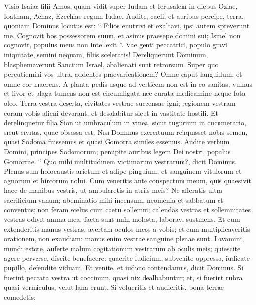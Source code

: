 \begin{biblechapter}
 \verse Visio Isaiae filii Amos, quam vidit super Iudam et Ierusalem in diebus Oziae, Ioatham, Achaz, Ezechiae regum Iudae.
 \verse Audite, caeli, et auribus percipe, terra,
 quoniam Dominus locutus est:
 “ Filios enutrivi et exaltavi,
 ipsi autem spreverunt me.
 \verse Cognovit bos possessorem suum,
 et asinus praesepe domini sui;
 Israel non cognovit,
 populus meus non intellexit ”.
 \verse Vae genti peccatrici,
 populo gravi iniquitate,
 semini nequam, filiis sceleratis!
 Dereliquerunt Dominum,
 blasphemaverunt Sanctum Israel,
 abalienati sunt retrorsum.
 \verse Super quo percutiemini vos ultra,
 addentes praevaricationem?
 Omne caput languidum,
 et omne cor maerens.
 \verse A planta pedis usque ad verticem
 non est in eo sanitas;
 vulnus et livor et plaga tumens
 non est circumligata
 nec curata medicamine neque fota oleo.
 \verse Terra vestra deserta,
 civitates vestrae succensae igni;
 regionem vestram coram vobis alieni devorant,
 et desolabitur sicut in vastitate hostili.
 \verse Et derelinquetur filia Sion
 ut umbraculum in vinea,
 sicut tugurium in cucumerario,
 sicut civitas, quae obsessa est.
 \verse Nisi Dominus exercituum reliquisset nobis semen,
 quasi Sodoma fuissemus
 et quasi Gomorra similes essemus.
 \verse Audite verbum Domini,
 principes Sodomorum;
 percipite auribus legem Dei nostri, populus Gomorrae.
 \verse “ Quo mihi multitudinem victimarum vestrarum?,
 dicit Dominus.
 Plenus sum holocaustis arietum
 et adipe pinguium;
 et sanguinem vitulorum
 et agnorum et hircorum nolui.
 \verse Cum veneritis ante conspectum meum,
 quis quaesivit haec de manibus vestris,
 ut ambularetis in atriis meis?
 \verse Ne afferatis ultra sacrificium vanum;
 abominatio mihi incensum,
 neomenia et sabbatum et conventus;
 non feram scelus cum coetu sollemni;
 \verse calendas vestras et sollemnitates vestras odivit anima mea,
 facta sunt mihi molesta, laboravi sustinens.
 \verse Et cum extenderitis manus vestras,
 avertam oculos meos a vobis;
 et cum multiplicaveritis orationem,
 non exaudiam:
 manus enim vestrae sanguine plenae sunt.
 \verse Lavamini, mundi estote,
 auferte malum cogitationum vestrarum ab oculis meis;
 quiescite agere perverse,
 \verse discite benefacere:
 quaerite iudicium, subvenite oppresso,
 iudicate pupillo, defendite viduam.
 \verse Et venite, et iudicio contendamus,
 dicit Dominus.
 Si fuerint peccata vestra ut coccinum,
 quasi nix dealbabuntur;
 et, si fuerint rubra quasi vermiculus,
 velut lana erunt.
 \verse Si volueritis et audieritis,
 bona terrae comedetis;

\end{biblechapter}
